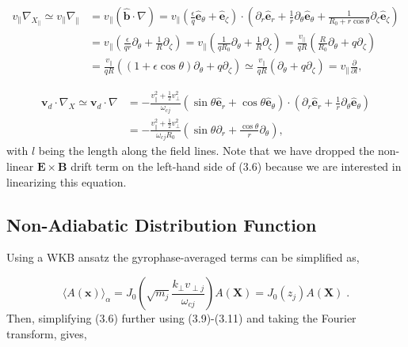 \documentclass[12pt]{article}
\numberwithin{equation}{section}
\begin{document}
   \begin{equation}
   \begin{aligned}
      v_\parallel\nabla_{X_\parallel} \simeq v_\parallel\nabla_\parallel &= 
         v_\parallel(\bm{\hat{b}}\cdot\nabla) = v_\parallel(\frac{\epsilon}{q}\bm{\hat{e}}_\theta +
         \bm{\hat{e}}_\zeta)\cdot(\partial_r\bm{\hat{e}}_r + \frac{1}{r}\partial_\theta\bm{\hat{e}}_\theta + \frac{1}{R_0 +
         r\cos\theta}\partial_\zeta\bm{\hat{e}}_\zeta) \\ &= 
         v_\parallel(\frac{\epsilon}{q r}\partial_\theta + \frac{1}{R}\partial_\zeta) = v_\parallel(\frac{1}{q R_0}\partial_\theta
         + \frac{1}{R}\partial_\zeta) = \frac{v_\parallel}{q R}(\frac{R}{R_0}\partial_\theta + q\partial_\zeta) \\ &=
         \frac{v_\parallel}{q R}((1+\epsilon\cos\theta)\partial_\theta + q\partial_\zeta)
         \simeq \frac{v_\parallel}{q R}(\partial_\theta + q\partial_\zeta) = v_\parallel\frac{\partial}{\partial l},
   \end{aligned}
   \end{equation}

   \begin{equation}
   \begin{aligned}
      \bm{v}_d\cdot\nabla_X \simeq \bm{v}_d\cdot\nabla &= -\frac{v_\parallel^2 + \frac{1}{2}v_\perp^2}{\omega_{cj}}
      (\sin\theta\bm{\hat{e}}_r + \cos\theta\bm{\hat{e}}_\theta)
      \cdot(\partial_r\bm{\hat{e}}_r + \frac{1}{r}\partial_\theta\bm{\hat{e}}_\theta) \\
      &= -\frac{v_\parallel^2 + \frac{1}{2}v_\perp^2}{\omega_{cj}R_0}(\sin\theta\partial_r + \frac{\cos\theta}{r}\partial_\theta),
   \end{aligned}
   \end{equation}
with $l$ being the length along the field lines. Note that we have dropped the non-linear $\bm{E}\times\bm{B}$ drift term on the left-hand
side of (3.6) because we are interested in linearizing this equation.

\subsection{Non-Adiabatic Distribution Function}
   \quad Using a WKB ansatz the gyrophase-averaged terms can be simplified as,
   
   \begin{equation}
      \langle A(\bm{x})\rangle_\alpha = J_0(\sqrt{m_j}\frac{k_\perp v_{\perp j}}{\omega_{cj}}) A(\bm{X}) = J_0(z_j)A(\bm{X})\;.
   \end{equation}
Then, simplifying (3.6) further using (3.9)-(3.11) and taking the Fourier transform, gives,
\end{document}
